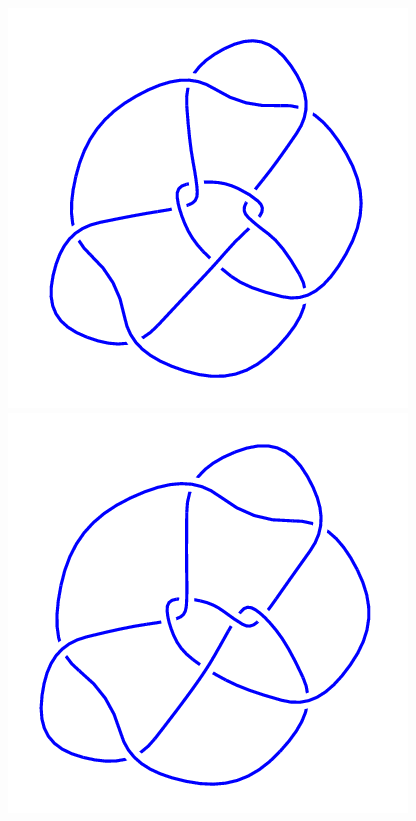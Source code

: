 \begin{figure}[H]
\begin{minipage}[b]{.18\linewidth}
	\end{minipage}
	\begin{minipage}[b]{.18\linewidth}
		\centering
		\includegraphics[width=\linewidth]{../data/10_109.png}
	\end{minipage}
	\begin{minipage}[b]{.18\linewidth}
		\centering
		\includegraphics[width=\linewidth]{../data/10_110.png}

\end{minipage}
\end{figure}

